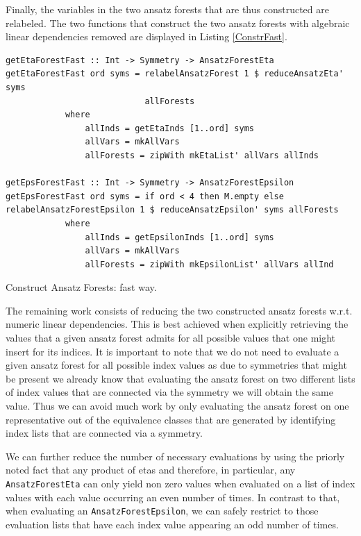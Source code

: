\documentclass[a4paper,12pt, DIV=14, BCOR=5mm, twoside, headsepline, numbers=noenddot]{scrbook}
\begin{document}
Finally, the variables in the two ansatz forests that are thus constructed are relabeled. The two functions that construct the two ansatz forests with algebraic linear dependencies removed are displayed in Listing \ref{ConstrFast}.
\begin{listing}[hbt!]
\begin{verbatim}
getEtaForestFast :: Int -> Symmetry -> AnsatzForestEta
getEtaForestFast ord syms = relabelAnsatzForest 1 $ reduceAnsatzEta' syms 
                            allForests
            where
                allInds = getEtaInds [1..ord] syms
                allVars = mkAllVars
                allForests = zipWith mkEtaList' allVars allInds

getEpsForestFast :: Int -> Symmetry -> AnsatzForestEpsilon
getEpsForestFast ord syms = if ord < 4 then M.empty else
relabelAnsatzForestEpsilon 1 $ reduceAnsatzEpsilon' syms allForests
            where
                allInds = getEpsilonInds [1..ord] syms
                allVars = mkAllVars
                allForests = zipWith mkEpsilonList' allVars allInd
\end{verbatim} 
\caption{Construct Ansatz Forests: fast way.}\label{ConstrFast}
\end{listing}

The remaining work consists of reducing the two constructed ansatz forests w.r.t. numeric linear dependencies. This is best achieved when explicitly retrieving the values that a given ansatz forest admits for all possible values that one might insert for its indices. It is important to note that we do not need to evaluate a given ansatz forest for all possible index values as due to symmetries that might be present we already know that evaluating the ansatz forest on two different lists of index values that are connected via the symmetry we will obtain the same value. Thus we can avoid much work by only evaluating the ansatz forest on one representative out of the equivalence classes that are generated by identifying index lists that are connected via a symmetry. 

We can further reduce the number of necessary evaluations by using the priorly noted fact that any product of etas and therefore, in particular, any \texttt{AnsatzForestEta} can only yield non zero values when evaluated on a list of index values with each value occurring an even number of times. In contrast to that, when evaluating an \texttt{AnsatzForestEpsilon}, we can safely restrict to those evaluation lists that have each index value appearing an odd number of times.
\end{document}
